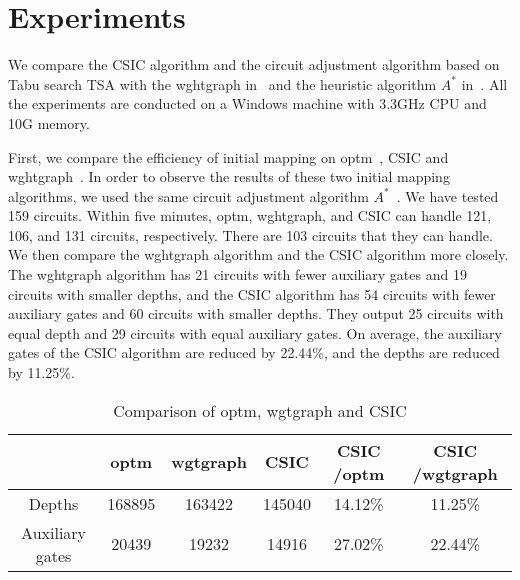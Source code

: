 \documentclass[journal]{IEEEtran}
\begin{document}
\section{Experiments}
\label{Experiment}
We compare the  CSIC  algorithm 
and the circuit adjustment algorithm based on Tabu search TSA with the wghtgraph in~\cite{2020Qubit} and the heuristic algorithm $ A^{*}$  in~\cite{Zulehner2017}.
All the experiments are conducted on a Windows machine with 3.3GHz CPU and 10G memory. 
 
First, we compare the efficiency of initial mapping on optm~\cite{Zulehner2017},  CSIC and wghtgraph~\cite{2020Qubit}. In order to  observe the results of these two initial mapping algorithms, we used the same circuit adjustment algorithm $A^{*}$~\cite{Zulehner2017}.
We have tested 159 circuits. Within five minutes, optm,  wghtgraph, and CSIC can handle 121, 106, and  131 circuits, respectively. There are 103 circuits that they can handle. We then compare the wghtgraph algorithm and the CSIC algorithm more closely. The wghtgraph algorithm has 21 circuits with fewer auxiliary gates  and 19 circuits with smaller depths, and the CSIC algorithm has 54 circuits with fewer auxiliary gates and 60 circuits with  smaller depths. They output 25 circuits with equal depth and  29 circuits with equal auxiliary gates. On average, the auxiliary gates of the CSIC algorithm are reduced by 22.44\%, 
and the depths are reduced by 11.25\%.
\begin{table*}[htbp]
	\begin{center}  
	\begin{tabular}{|c|c|c|c|c|c|}
	\hline
	    	&  optm & wgtgraph &CSIC & CSIC /optm & CSIC /wgtgraph\\
	\hline
	 Depths 	&	168895	&   163422	&  145040 	& 14.12\%  &11.25\%   \\
	\hline
	 Auxiliary gates 	&	20439	&  19232 	&  14916 & 27.02\% 	&  22.44\%  \\
	\hline
	\end{tabular} 
	\end{center} 
	\caption{Comparison of optm, wgtgraph and CSIC}
	\label{tab1}
	\end{table*}
\end{document}

